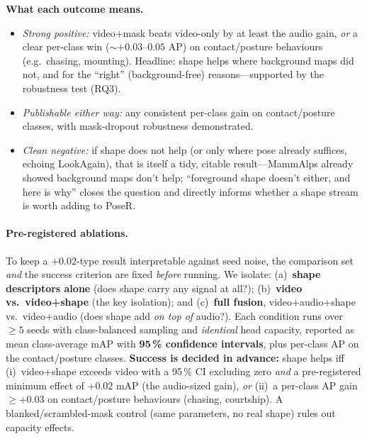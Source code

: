 \documentclass[11pt]{article}
\begin{document}
\noindent\textbf{What each outcome means.}
\begin{itemize}
  \item \emph{Strong positive:} video+mask beats video-only by at least the audio gain, \emph{or} a clear per-class win ($\sim+0.03$--$0.05$ AP) on contact/posture behaviours (e.g.\ chasing, mounting). Headline: shape helps where background maps did not, and for the ``right'' (background-free) reasons---supported by the robustness test (RQ3).
  \item \emph{Publishable either way:} any consistent per-class gain on contact/posture classes, with mask-dropout robustness demonstrated.
  \item \emph{Clean negative:} if shape does not help (or only where pose already suffices, echoing LookAgain), that is itself a tidy, citable result---MammAlps already showed background maps don't help; ``foreground shape doesn't either, and here is why'' closes the question and directly informs whether a shape stream is worth adding to PoseR.
\end{itemize}

\paragraph{Pre-registered ablations.} To keep a $+0.02$-type result interpretable against seed noise, the comparison set \emph{and} the success criterion are fixed \emph{before} running. We isolate: (a)~\textbf{shape descriptors alone} (does shape carry any signal at all?); (b)~\textbf{video vs.\ video+shape} (the key isolation); and (c)~\textbf{full fusion}, video+audio+shape vs.\ video+audio (does shape add \emph{on top of} audio?). Each condition runs over $\geq 5$ seeds with class-balanced sampling and \emph{identical} head capacity, reported as mean class-average mAP with \textbf{95\,\% confidence intervals}, plus per-class AP on the contact/posture classes. \textbf{Success is decided in advance:} shape helps iff (i)~video+shape exceeds video with a 95\,\% CI excluding zero \emph{and} a pre-registered minimum effect of $+0.02$ mAP (the audio-sized gain), \emph{or} (ii)~a per-class AP gain $\geq +0.03$ on contact/posture behaviours (chasing, courtship). A blanked/scrambled-mask control (same parameters, no real shape) rules out capacity effects.

\end{document}
